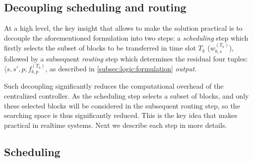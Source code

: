 \subsection{Decoupling scheduling and routing}
\label{subsec:logic:separation}

At a high level, the key insight that allows \name to make the solution practical is
to decouple the aforementioned formulation into two steps:
a {\em scheduling} step which firstly selects the subset of blocks to be transferred in time slot $T_k$
($w^{(T_k)}_{b,s}$), followed by a subsequent {\em routing}
step which determines the residual four tuples: $\langle s, s', p, f_{b,p}^{(T_k)}$, as described in \Section\ref{subsec:logic:formulation} {\em output}.

Such decoupling significantly reduces the computational overhead of the centralized controller. As the scheduling step selects a subset of blocks, and only these selected blocks will be considered in the subsequent routing step, so the searching space is thus significantly reduced. This is the key idea that makes \name practical in realtime systems.
Next we describe each step in more details.




\subsection{Scheduling}
\label{subsec:logic:scheduling}

